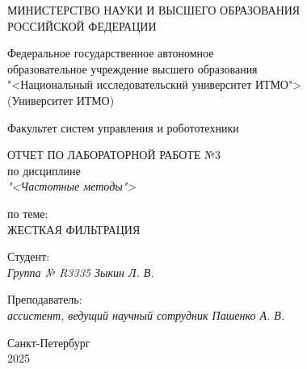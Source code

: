 \thispagestyle{empty}

\begin{center}
    МИНИСТЕРСТВО НАУКИ И ВЫСШЕГО ОБРАЗОВАНИЯ \\ РОССИЙСКОЙ ФЕДЕРАЦИИ

    \vspace{20pt}

    Федеральное государственное автономное \\ образовательное учреждение высшего образования \\
    "<Национальный исследовательский университет ИТМО"> \\
    (Университет ИТМО)

    \vspace{20pt}

    Факультет систем управления и робототехники
\end{center}

\vfill

\begin{center}
    ОТЧЕТ ПО ЛАБОРАТОРНОЙ РАБОТЕ №3\\  
    по дисциплине \\
    \textit{"<Частотные методы">}

    \vspace{20pt}

    по теме: \\
    \uppercase{Жесткая фильтрация}
\end{center}

\vfill

    \noindent Студент: \\
    \textit{Группа № R3335 \hfill Зыкин Л. В.}

    \vspace{20pt}

    \noindent Преподаватель: \\
    \textit{ассистент, ведущий научный сотрудник \hfill Пашенко А. В.}

\vfill

\begin{center}
    Санкт-Петербург \\ 2025
\end{center}